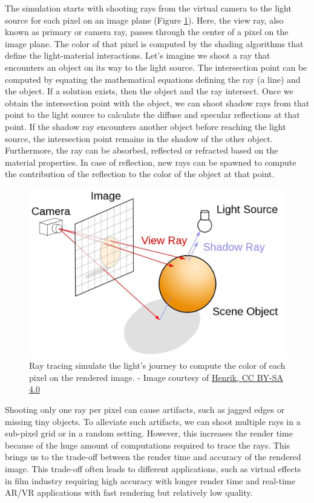 The simulation starts with shooting rays from the virtual camera to the light source for each pixel on an image plane (Figure \ref{fig:raytracing}). Here, the view ray,  also known as primary or camera ray, passes through the center of a pixel on the image plane. The color of that pixel is computed by the shading algorithms that define the light-material interactions. Let's imagine we shoot a ray that encounters an object on its way to the light source. The intersection point can be computed by equating the mathematical equations defining the ray (a line) and the object. If a solution exists, then the object and the ray intersect. Once we obtain the intersection point with the object, we can shoot shadow rays from that point to the light source to calculate the diffuse and specular reflections at that point. If the shadow ray encounters another object before reaching the light source,  the intersection point remains in the shadow of the other object. Furthermore, the ray can be absorbed, reflected or refracted based on the material properties. In case of reflection, new rays can be spawned to compute the contribution of the reflection to the color of the object at that point.



\begin{figure}
  \centering
   \includegraphics[width=0.5\linewidth]{Images/ray-tracing-image-1.jpg}
   \caption{Ray tracing simulate the light's journey to compute the color of each pixel on the rendered image. - Image courtesy of \href{https://commons.wikimedia.org/wiki/File:Ray_trace_diagram.svg}{Henrik, CC BY-SA 4.0}}
   \label{fig:raytracing}
\end{figure}

Shooting only one ray per pixel can cause artifacts, such as jagged edges or missing tiny objects. To alleviate such artifacts, we can shoot multiple rays in a sub-pixel grid or in a random setting. However, this increases the render time  because of the huge amount of computations required to trace the rays. This brings us to the trade-off between the render time and accuracy of the rendered image. This trade-off often leads to different applications, such as virtual effects in film industry requiring high accuracy with longer render time and real-time AR/VR applications with fast rendering but relatively low quality.


